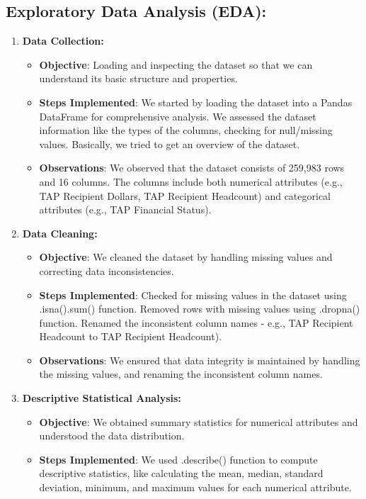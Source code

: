 \documentclass[sigconf]{acmart}
\begin{document}
\subsection{Exploratory Data Analysis (EDA):}
\begin{enumerate}
    \item \textbf{Data Collection:}
    \begin{itemize}
        \item \textbf{Objective}: Loading and inspecting the dataset so that we can understand its basic structure and properties.
        \item \textbf{Steps Implemented}: We started by loading the dataset into a Pandas DataFrame for comprehensive analysis. We assessed the dataset information like the types of the columns, checking for null/missing values. Basically, we tried to get an overview of the dataset.
        \item \textbf{Observations}: We observed that the dataset consists of 259,983 rows and 16 columns. The columns include both numerical attributes (e.g., TAP Recipient Dollars, TAP Recipient Headcount) and categorical attributes (e.g., TAP Financial Status).
    \end{itemize}
    \item \textbf{Data Cleaning:}
    \begin{itemize}
        \item \textbf{Objective}: We cleaned the dataset by handling missing values and correcting data inconsistencies.
        \item \textbf{Steps Implemented}: Checked for missing values in the dataset using .isna().sum() function. Removed rows with missing values using .dropna() function. Renamed the inconsistent column names - e.g., TAP Recipient Headcount to TAP Recipient Headcount).
        \item \textbf{Observations}: We ensured that data integrity is maintained by handling the missing values, and renaming the inconsistent column names.
    \end{itemize}
    \item \textbf{Descriptive Statistical Analysis:}
    \begin{itemize}
        \item \textbf{Objective}: We obtained summary statistics for numerical attributes and understood the data distribution.
        \item \textbf{Steps Implemented}: We used .describe() function to compute descriptive statistics, like calculating the mean, median, standard deviation, minimum, and maximum values for each numerical attribute.

\end{itemize}
\end{enumerate}
\end{document}
